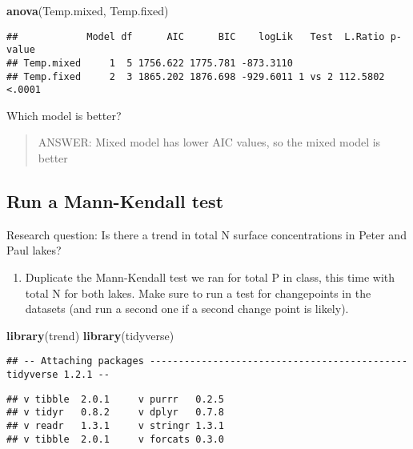 \documentclass[]{article}
\newenvironment{Shaded}{\begin{snugshade}}{\end{snugshade}}
\newcommand{\KeywordTok}[1]{\textcolor[rgb]{0.13,0.29,0.53}{\textbf{#1}}}
\newcommand{\NormalTok}[1]{#1}
\providecommand{\tightlist}{%
  \setlength{\itemsep}{0pt}\setlength{\parskip}{0pt}}
\begin{document}
\begin{Shaded}
\begin{Highlighting}[]
\KeywordTok{anova}\NormalTok{(Temp.mixed, Temp.fixed)}
\end{Highlighting}
\end{Shaded}

\begin{verbatim}
##            Model df      AIC      BIC    logLik   Test  L.Ratio p-value
## Temp.mixed     1  5 1756.622 1775.781 -873.3110                        
## Temp.fixed     2  3 1865.202 1876.698 -929.6011 1 vs 2 112.5802  <.0001
\end{verbatim}

Which model is better?

\begin{quote}
ANSWER: Mixed model has lower AIC values, so the mixed model is better
\end{quote}

\subsection{Run a Mann-Kendall test}\label{run-a-mann-kendall-test}

Research question: Is there a trend in total N surface concentrations in
Peter and Paul lakes?

\begin{enumerate}
\def\labelenumi{\arabic{enumi}.}
\setcounter{enumi}{3}
\tightlist
\item
  Duplicate the Mann-Kendall test we ran for total P in class, this time
  with total N for both lakes. Make sure to run a test for changepoints
  in the datasets (and run a second one if a second change point is
  likely).
\end{enumerate}

\begin{Shaded}
\begin{Highlighting}[]
\KeywordTok{library}\NormalTok{(trend)}
\KeywordTok{library}\NormalTok{(tidyverse)}
\end{Highlighting}
\end{Shaded}

\begin{verbatim}
## -- Attaching packages --------------------------------------------- tidyverse 1.2.1 --
\end{verbatim}

\begin{verbatim}
## v tibble  2.0.1     v purrr   0.2.5
## v tidyr   0.8.2     v dplyr   0.7.8
## v readr   1.3.1     v stringr 1.3.1
## v tibble  2.0.1     v forcats 0.3.0
\end{verbatim}
\end{document}
